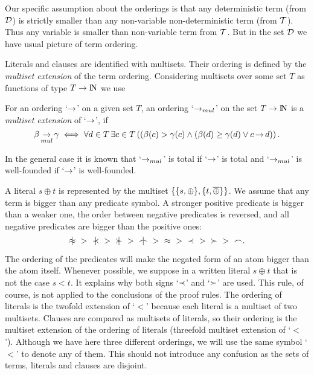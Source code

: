Our specific assumption about the orderings is that any
deterministic term (from ${\cal D}$) is strictly smaller than any non-variable
non-deterministic term (from \({\cal T}\)). Thus
any variable is smaller than non-variable term from
${\cal T}$.  But in the set ${\cal D}$ we have usual picture of term ordering.

Literals and clauses are identified with multisets. Their ordering is defined by the
{\em multiset extension} \cite{DM} of the term ordering.  Considering
multisets over some set $T$ as functions of type \(T\to {{\rm I\!N}}\) we use
\begin{definition} \label{def:multiset-ordering}
For an ordering `$\mathop{\rightarrow}$' on a given set $T$, an ordering `\(\mathop{\mathop{\mathop{\rightarrow}}_{mul}}\)' on the
set \(T\to {{\rm I\!N}}\) is a {\em multiset extension} of `$\mathop{\rightarrow}$', if
\[\beta \mathop{\mathop{\mathop{\rightarrow}}_{mul}} \gamma \iff \forall d\in  T\,\exists c\in T\/  \left( (\beta
(c)>\gamma (c) \land (\beta (d)\geq \gamma (d)\lor c\mathop{\rightarrow} d  )\right).\]
\end{definition}
In the general case it is known \cite{DM} that `$\mathop{\mathop{\mathop{\rightarrow}}_{mul}}$' is total if
`$\mathop{\rightarrow}$' is total and `$\mathop{\mathop{\mathop{\rightarrow}}_{mul}}$' is well-founded if `$\mathop{\rightarrow}$' is well-founded.

A literal $s\oplus t$ is represented by the multiset \(\{\{s,\oplus\},
\{t,\overline{\oplus}\}\}\).  We assume that any term is bigger than any predicate
symbol.  A stronger positive predicate is bigger than a weaker one, the order
between negative predicates is reversed, and all negative predicates are
bigger than the positive ones:
\begin{equation} \label{eq:predicate-order}
\notEq\ >\ \notIncl\ >\ \notCont\ >\ \notInt\ >\ \Eq\ >\ \Incl\ >\ \Cont\ >\
\Int.
\end{equation}

The ordering of the predicates will make the negated form of an atom bigger
than the atom itself.  Whenever possible, we suppose in a written literal
$s\oplus t$ that is not the case \(s < t\). It explains why both signs
`$\mathbin{\prec}$' and `$\mathbin{\succ}$' are used. This rule, of course, is not applied to the
conclusions of the proof rules.  The ordering of literals is the twofold
extension of `$<$' because each literal is a multiset of two multisets.
Clauses are compared as multisets of literals, so their ordering is the
multiset extension of the ordering of literals (threefold multiset extension
of `$<$'). Although we have here three different orderings, we will use the
same symbol `$<$' to denote any of them. This should not introduce any
confusion as the sets of terms, literals and clauses are disjoint.

